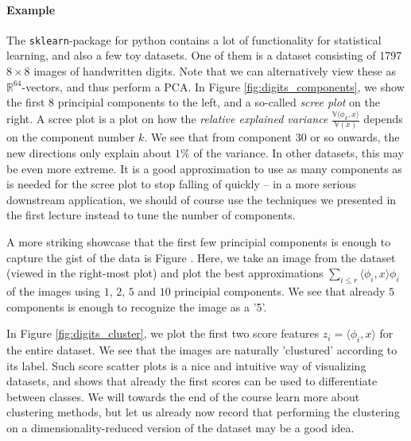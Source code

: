 \documentclass{article}
\newcommand{\sprod}[1]{\langle #1 \rangle}
\newcommand{\R}{\mathbb{R}}
\begin{document}
\paragraph{Example} The \texttt{sklearn}-package for python contains a lot of functionality for statistical learning, and also a few toy datasets. One of them is a dataset consisting of 1797 $8\times 8$ images of handwritten digits. Note that we can alternatively view these as $\R^{64}$-vectors, and thus perform a PCA. In Figure \ref{fig:digits_components}, we show the first $8$ principial components to the left, and a so-called \emph{scree plot} on the right. A scree plot is a plot on how the \emph{relative explained variance} $\frac{\mathbb{V}\sprod{\phi_k,x}}{\mathbb{V}(x)}$ depends on the component number $k$. We see that from component $30$ or so onwards, the new directions only explain about $1\%$ of the variance. In other datasets, this may be even more extreme. It is a good approximation to use as many components as is needed for the scree plot to stop falling of quickly -- in a more serious downstream application, we should of course use the techniques we presented in the first lecture instead to tune the number of components.

A more striking showcase that the first few principial components is enough to capture the gist of the data is Figure \label{fig:digits_approx}. Here, we take an image from the dataset (viewed in the right-most plot) and plot the best approximations $\sum_{i\leq r} \sprod{\phi_i,x}\phi_i$ of the images using $1$, $2$, $5$ and $10$ principial components. We see that already $5$ components is enough to recognize the image as a '5'.

In Figure \ref{fig:digits_cluster}, we plot the first two score features $z_i =\sprod{\phi_i,x}$ for the entire dataset. We see that the images are naturally 'clustured' according to its label. Such score scatter plots is a nice and intuitive way of visualizing datasets, and shows that already the first scores can be used to differentiate between classes. We will towards the end of the course learn more about clustering methods, but let us already now record that performing the clustering on a dimensionality-reduced version of the dataset may be a good idea.
\end{document}
